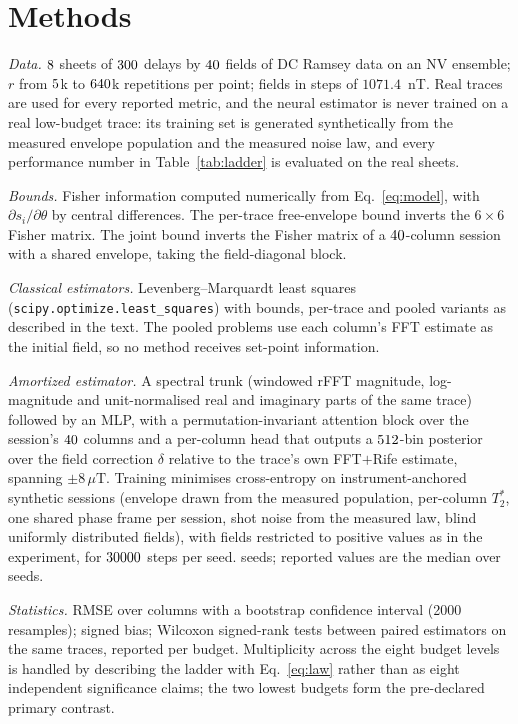 \documentclass[aps,pra,twocolumn,superscriptaddress,nofootinbib]{revtex4-2}
\newcommand{\muT}{\,\mu\mathrm{T}}
\begin{document}
\section{Methods}

\emph{Data.} $8$ sheets of $300$ delays by $40$ fields of DC Ramsey data on an
NV ensemble; $r$ from $5$k to $640$k repetitions per point; fields in steps of
$1071.4$~nT. Real traces are used for every reported metric, and the neural estimator is
never trained on a real low-budget trace: its training set is generated synthetically from
the measured envelope population and the measured noise law, and every performance number
in Table~\ref{tab:ladder} is evaluated on the real sheets.

\emph{Bounds.} Fisher information computed numerically from Eq.~\eqref{eq:model}, with
$\partial s_i/\partial\theta$ by central differences. The per-trace free-envelope bound
inverts the $6\times6$ Fisher matrix. The joint bound inverts the Fisher matrix of a
$40$-column session with a shared envelope, taking the field-diagonal block.

\emph{Classical estimators.} Levenberg--Marquardt least squares
(\texttt{scipy.optimize.least\_squares}) with bounds, per-trace and pooled variants as
described in the text. The pooled problems use each column's FFT estimate as the initial
field, so no method receives set-point information.

\emph{Amortized estimator.} A spectral trunk (windowed rFFT magnitude, log-magnitude and
unit-normalised real and imaginary parts of the same trace) followed by an MLP, with a
permutation-invariant attention block over the session's $40$ columns and a per-column
head that outputs a $512$-bin posterior over the field correction $\delta$ relative to
the trace's own FFT$+$Rife estimate, spanning $\pm8\muT$. Training minimises cross-entropy
on instrument-anchored synthetic sessions (envelope drawn from the measured population,
per-column $T_2^{*}$, one shared phase frame per session, shot noise from the measured law,
blind uniformly distributed fields), with fields restricted to positive values as in the
experiment, for $30000$ steps per seed. \nSeedsNetSet{} seeds; reported values are the median over seeds.

\emph{Statistics.} RMSE over columns with a bootstrap confidence interval (2000 resamples);
signed bias; Wilcoxon signed-rank tests between paired estimators on the same traces,
reported per budget. Multiplicity across the eight budget levels is handled by describing
the ladder with Eq.~\eqref{eq:law} rather than as eight independent significance claims; the
two lowest budgets form the pre-declared primary contrast.
\end{document}
